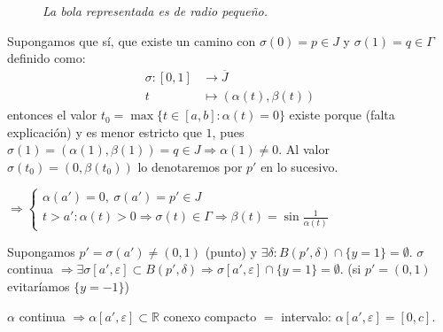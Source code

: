 \begin{ej}
\begin{enumerate}
\begin{demo}
\begin{figure}[H]
        \caption{\textit{La bola representada es de radio pequeño.}}
        \label{fig:seno_topologo_caminos}
    \end{figure}
    
	Supongamos que sí, que existe un camino con $\sigma(0) = p \in J$ y $\sigma(1) = q \in \Gamma$ definido como:
	\begin{align*}
		\sigma : [0, 1] &\longrightarrow \overline{J} \\
					t &\longmapsto (\alpha(t), \beta(t))
	\end{align*}
	entonces el valor $t_0 = \max \{t \in \left[ a, b \right] : \alpha\left( t \right) = 0\}$ existe porque (falta explicación) y es menor estricto que $1$, pues $\sigma(1) = (\alpha(1), \beta(1)) = q \in J \Rightarrow \alpha(1) \neq 0$. Al valor $\sigma(t_0) = (0, \beta(t_0))$ lo denotaremos por $p'$ en lo sucesivo.
	
	   $\Rightarrow \begin{cases}
                \alpha\left( a' \right) = 0,\ \sigma\left( a' \right) = p' \in J\\
                t > a': \alpha\left( t \right) > 0 \Rightarrow \sigma\left( t \right) \in \Gamma \Rightarrow \beta\left( t \right) = \sin \frac{1}{\alpha\left( t \right)} 
            \end{cases} $

            Supongamos $p' = \sigma\left( a' \right) \neq \left( 0, 1 \right)$ (punto) y $\exists \delta: B\left( p', \delta \right) \cap \{y = 1\} = \emptyset$. $\sigma$ continua $\Rightarrow \exists \sigma\left[ a', \varepsilon \right] \subset B\left( p', \delta \right) \Rightarrow \sigma\left[ a', \varepsilon \right] \cap \{y = 1\} = \emptyset$. (si $p' = \left( 0, 1 \right)$ evitaríamos $\{y = -1\}$)

            $\alpha$ continua $\Rightarrow \alpha\left[ a', \varepsilon \right] \subset \mathbb{R}$ conexo compacto $=$ intervalo: $\alpha\left[ a', \varepsilon \right] = \left[ 0, c \right]$.


\end{demo}
\end{enumerate}
\end{ej}
